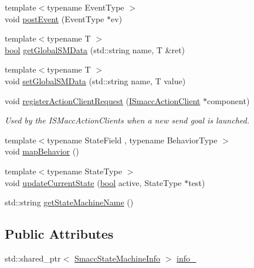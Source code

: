 \begin{DoxyCompactItemize}
\item 
{\footnotesize template$<$typename Event\+Type $>$ }\\void \hyperlink{classsmacc_1_1ISmaccStateMachine_ad80cdd7bbc9a9f3b221c625754fed1ed}{post\+Event} (Event\+Type $\ast$ev)
\item 
{\footnotesize template$<$typename T $>$ }\\\hyperlink{classbool}{bool} \hyperlink{classsmacc_1_1ISmaccStateMachine_aeda2d6813c6c428bf318a5792e014b61}{get\+Global\+S\+M\+Data} (std\+::string name, T \&ret)
\item 
{\footnotesize template$<$typename T $>$ }\\void \hyperlink{classsmacc_1_1ISmaccStateMachine_a8588f9e580fbb95b53e2bd2ca3ff1f98}{set\+Global\+S\+M\+Data} (std\+::string name, T value)
\item 
void \hyperlink{classsmacc_1_1ISmaccStateMachine_aacef10d3f0c509612114ff7b21a239d1}{register\+Action\+Client\+Request} (\hyperlink{classsmacc_1_1ISmaccActionClient}{I\+Smacc\+Action\+Client} $\ast$component)
\begin{DoxyCompactList}\small\item\em Used by the I\+S\+Macc\+Action\+Clients when a new send goal is launched. \end{DoxyCompactList}\item 
{\footnotesize template$<$typename State\+Field , typename Behavior\+Type $>$ }\\void \hyperlink{classsmacc_1_1ISmaccStateMachine_acfb75233b79062cc7769ea751b7f320d}{map\+Behavior} ()
\item 
{\footnotesize template$<$typename State\+Type $>$ }\\void \hyperlink{classsmacc_1_1ISmaccStateMachine_aea0936b00b0186e8d4e514af16f69766}{update\+Current\+State} (\hyperlink{classbool}{bool} active, State\+Type $\ast$test)
\item 
std\+::string \hyperlink{classsmacc_1_1ISmaccStateMachine_a2d0b1742f17dd77d5df217153e8b5259}{get\+State\+Machine\+Name} ()
\end{DoxyCompactItemize}
\subsection*{Public Attributes}
\begin{DoxyCompactItemize}
\item 
std\+::shared\+\_\+ptr$<$ \hyperlink{classsmacc_1_1SmaccStateMachineInfo}{Smacc\+State\+Machine\+Info} $>$ \hyperlink{classsmacc_1_1ISmaccStateMachine_a5ec3201cbddab4f062f572fb33021041}{info\+\_\+}
\end{DoxyCompactItemize}
